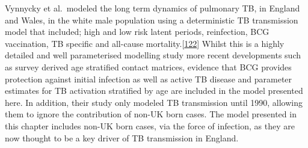 \documentclass[11pt,twoside]{bristolthesis}
\begin{document}
  Vynnycky et al.~modeled the long term dynamics of pulmonary TB, in England and Wales, in the white male population using a deterministic TB transmission model that included; high and low risk latent periods, reinfection, BCG vaccination, TB specific and all-cause mortality.{[}\protect\hyperlink{ref-Vynnycky1997a}{122}{]} Whilst this is a highly detailed and well parameterised modelling study more recent developments such as survey derived age stratified contact matrices, evidence that BCG provides protection against initial infection as well as active TB disease and parameter estimates for TB activation stratified by age are included in the model presented here. In addition, their study only modeled TB transmission until 1990, allowing them to ignore the contribution of non-UK born cases. The model presented in this chapter includes non-UK born cases, via the force of infection, as they are now thought to be a key driver of TB transmission in England.
  
\end{document}
